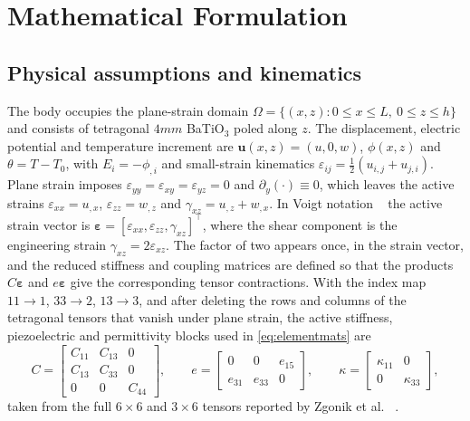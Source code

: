 \documentclass[pdflatex,sn-mathphys-num]{sn-jnl}
\begin{document}
\section{Mathematical Formulation}
\label{sec:theory}

\subsection{Physical assumptions and kinematics}

The body occupies the plane-strain domain $\Omega=\{(x,z):0\le x\le L,\ 0\le z\le h\}$
and consists of tetragonal $4mm$ BaTiO$_3$ poled along $z$. The displacement, electric
potential and temperature increment are $\bm u(x,z)=(u,0,w)$, $\phi(x,z)$ and
$\theta=T-T_0$, with $E_i=-\phi_{,i}$ and small-strain kinematics
$\varepsilon_{ij}=\tfrac12(u_{i,j}+u_{j,i})$. Plane strain imposes
$\varepsilon_{yy}=\varepsilon_{xy}=\varepsilon_{yz}=0$ and $\partial_y(\cdot)\equiv0$,
which leaves the active strains $\varepsilon_{xx}=u_{,x}$, $\varepsilon_{zz}=w_{,z}$
and $\gamma_{xz}=u_{,z}+w_{,x}$. In Voigt notation ~\cite{Nye1985,IEEE176} the active
strain vector is $\bm\varepsilon=[\varepsilon_{xx},\varepsilon_{zz},\gamma_{xz}]^\top$,
where the shear component is the engineering strain $\gamma_{xz}=2\varepsilon_{xz}$.
The factor of two appears once, in the strain vector, and the reduced stiffness and
coupling matrices are defined so that the products $C\bm\varepsilon$ and
$e\bm\varepsilon$ give the corresponding tensor contractions. With the index map
$11\to1$, $33\to2$, $13\to3$, and after deleting the rows and columns of the tetragonal
tensors that vanish under plane strain, the active stiffness, piezoelectric and
permittivity blocks used in \eqref{eq:elementmats} are
\begin{equation}
C=\begin{bmatrix}C_{11}&C_{13}&0\\C_{13}&C_{33}&0\\0&0&C_{44}\end{bmatrix},
\qquad
e=\begin{bmatrix}0&0&e_{15}\\e_{31}&e_{33}&0\end{bmatrix},
\qquad
\kappa=\begin{bmatrix}\kappa_{11}&0\\0&\kappa_{33}\end{bmatrix},
\label{eq:voigtblocks}
\end{equation}
taken from the full $6\times6$ and $3\times6$ tensors reported by Zgonik et al.
~\cite{Zgonik1994}.
\end{document}
